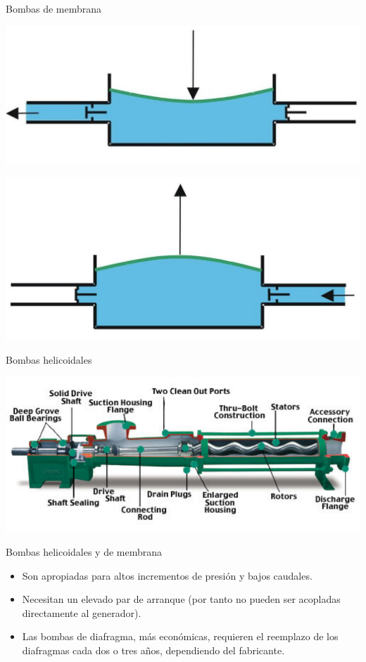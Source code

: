 \documentclass[xcolor={usenames,svgnames,dvipsnames}]{beamer}
\begin{document}
\begin{frame}[label={sec:org33d300d}]{Bombas de membrana}
\begin{center}
\includegraphics[width=.9\linewidth]{../figs/800px-Bomba_diafragma_impulsando.pdf}
\end{center}

\begin{center}
\includegraphics[width=.9\linewidth]{../figs/Bomba_diafragma_aspirando.pdf}
\end{center}
\end{frame}

\begin{frame}[label={sec:orgd5e2cd8}]{Bombas helicoidales}
\begin{center}
\includegraphics[width=.9\linewidth]{../figs/bombatornillo.pdf}
\end{center}
\end{frame}

\begin{frame}[label={sec:org17048ce}]{Bombas helicoidales y de membrana}
\begin{itemize}
\item Son apropiadas para \alert{altos incrementos de presión y bajos caudales}.

\item Necesitan un \alert{elevado par de arranque} (por tanto no pueden ser acopladas directamente al generador).

\item Las bombas de diafragma, más económicas, requieren el \alert{reemplazo de los diafragmas} cada dos o tres años, dependiendo del fabricante.
\end{itemize}
\end{frame}
\end{document}
